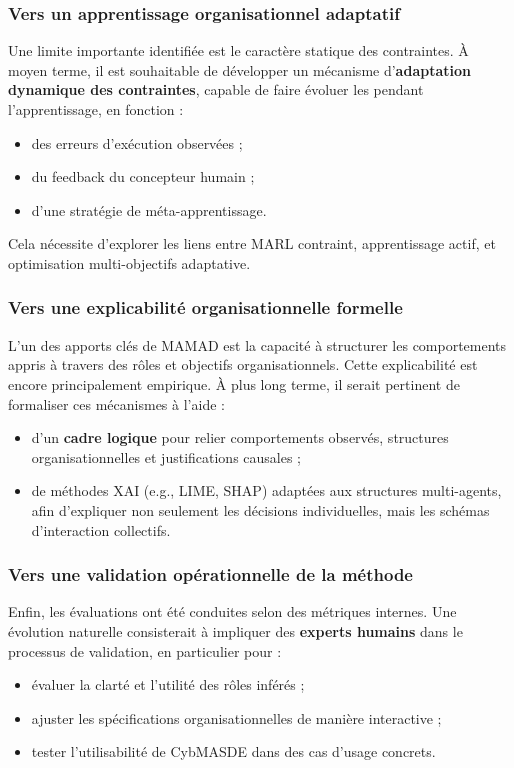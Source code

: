 \subsubsection*{Vers un apprentissage organisationnel adaptatif}

Une limite importante identifiée est le caractère statique des contraintes. À moyen terme, il est souhaitable de développer un mécanisme d’\textbf{adaptation dynamique des contraintes}, capable de faire évoluer les  pendant l’apprentissage, en fonction :
\begin{itemize}
    \item des erreurs d’exécution observées ;
    \item du feedback du concepteur humain ;
    \item d’une stratégie de méta-apprentissage.
\end{itemize}

Cela nécessite d’explorer les liens entre MARL contraint, apprentissage actif, et optimisation multi-objectifs adaptative.

\subsubsection*{Vers une explicabilité organisationnelle formelle}

L’un des apports clés de MAMAD est la capacité à structurer les comportements appris à travers des rôles et objectifs organisationnels. Cette explicabilité est encore principalement empirique. À plus long terme, il serait pertinent de formaliser ces mécanismes à l’aide :
\begin{itemize}
    \item d’un \textbf{cadre logique} pour relier comportements observés, structures organisationnelles et justifications causales ;
    \item de méthodes XAI (e.g., LIME, SHAP) adaptées aux structures multi-agents, afin d’expliquer non seulement les décisions individuelles, mais les schémas d’interaction collectifs.
\end{itemize}

\subsubsection*{Vers une validation opérationnelle de la méthode}

Enfin, les évaluations ont été conduites selon des métriques internes. Une évolution naturelle consisterait à impliquer des \textbf{experts humains} dans le processus de validation, en particulier pour :
\begin{itemize}
    \item évaluer la clarté et l’utilité des rôles inférés ;
    \item ajuster les spécifications organisationnelles de manière interactive ;
    \item tester l’utilisabilité de CybMASDE dans des cas d’usage concrets.
\end{itemize}

